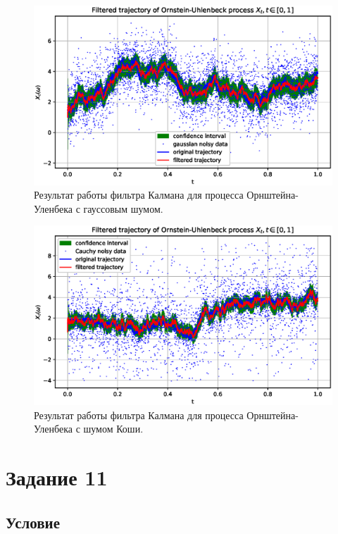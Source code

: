 \documentclass[11pt]{report}
\begin{document}
\begin{figure}[H]
    \centering
    \includegraphics[width=0.9\linewidth]{images/kalman-gaussian.eps}
    \caption{Результат работы фильтра Калмана для процесса Орнштейна-Уленбека с гауссовым шумом.}
    \label{fig:kalman-gaussian}
\end{figure}

\begin{figure}[H]
    \centering
    \includegraphics[width=0.9\linewidth]{images/kalman-cauchy.eps}
    \caption{Результат работы фильтра Калмана для процесса Орнштейна-Уленбека с шумом Коши.}
    \label{fig:kalman-cauchy}
\end{figure}

\newpage

\section{Задание 11}

\subsection{Условие}
\end{document}
